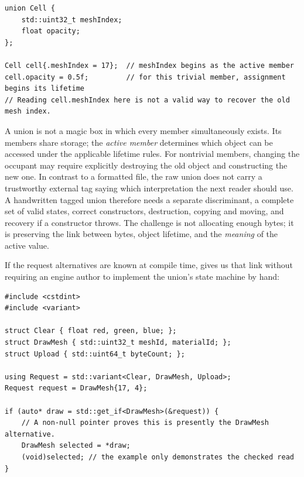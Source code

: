 \begin{verbatim}
union Cell {
    std::uint32_t meshIndex;
    float opacity;
};

Cell cell{.meshIndex = 17};  // meshIndex begins as the active member
cell.opacity = 0.5f;         // for this trivial member, assignment begins its lifetime
// Reading cell.meshIndex here is not a valid way to recover the old mesh index.
\end{verbatim}

A union is not a magic box in which every member simultaneously exists. Its members share storage; the \emph{active member} determines which object can be accessed under the applicable lifetime rules. For nontrivial members, changing the occupant may require explicitly destroying the old object and constructing the new one. In contrast to a formatted file, the raw union does not carry a trustworthy external tag saying which interpretation the next reader should use. A handwritten tagged union therefore needs a separate discriminant, a complete set of valid states, correct constructors, destruction, copying and moving, and recovery if a constructor throws. The challenge is not allocating enough bytes; it is preserving the link between bytes, object lifetime, and the \emph{meaning} of the active value.

If the request alternatives are known at compile time,  gives us that link without requiring an engine author to implement the union's state machine by hand:

\begin{verbatim}
#include <cstdint>
#include <variant>

struct Clear { float red, green, blue; };
struct DrawMesh { std::uint32_t meshId, materialId; };
struct Upload { std::uint64_t byteCount; };

using Request = std::variant<Clear, DrawMesh, Upload>;
Request request = DrawMesh{17, 4};

if (auto* draw = std::get_if<DrawMesh>(&request)) {
    // A non-null pointer proves this is presently the DrawMesh alternative.
    DrawMesh selected = *draw;
    (void)selected; // the example only demonstrates the checked read
}
\end{verbatim}

